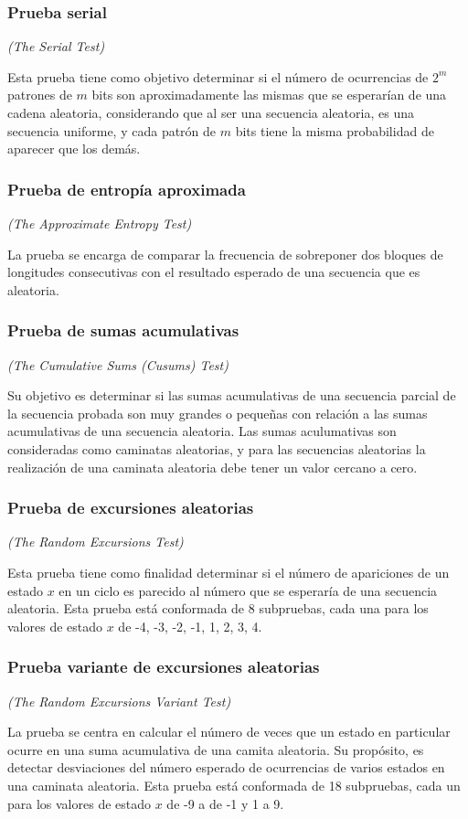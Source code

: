 \subsubsection{Prueba serial} %
\textit{(The Serial Test)}

Esta prueba tiene como objetivo determinar si el número de ocurrencias de
$2^m$ patrones de $m$ bits son aproximadamente las mismas que se esperarían
de una cadena aleatoria, considerando que al ser una secuencia aleatoria,
es una secuencia uniforme, y cada patrón de $m$ bits tiene la misma
probabilidad de aparecer que los demás.

\subsubsection{Prueba de entropía aproximada} %
\textit{(The Approximate Entropy Test)}

La prueba se encarga de comparar la frecuencia de sobreponer dos bloques de
longitudes consecutivas con el resultado esperado de una secuencia que es
aleatoria.

\subsubsection{Prueba de sumas acumulativas} %
\textit{(The Cumulative Sums (Cusums) Test)}

Su objetivo es determinar si las sumas acumulativas de una secuencia parcial
de la secuencia probada son muy grandes o pequeñas con relación a las sumas
acumulativas de una secuencia aleatoria. Las sumas aculumativas son
consideradas como caminatas aleatorias, y para las secuencias aleatorias
la realización de una caminata aleatoria debe tener un valor cercano a cero.

\subsubsection{Prueba de excursiones aleatorias} %
\textit{(The Random Excursions Test)}

Esta prueba tiene como finalidad determinar si el número de apariciones de un
estado $x$ en un ciclo es parecido al número que se esperaría de una secuencia
aleatoria. Esta prueba está conformada de 8 subpruebas, cada una para los
valores de estado $x$ de -4, -3, -2, -1, 1, 2, 3, 4.

\subsubsection{Prueba variante de excursiones aleatorias} %
\textit{(The Random Excursions Variant Test)}

La prueba se centra en calcular el número de veces que un estado en particular
ocurre en una suma acumulativa de una camita aleatoria. Su propósito, es
detectar desviaciones del número esperado de ocurrencias de varios estados
en una caminata aleatoria. Esta prueba está conformada de 18 subpruebas, cada
un para los valores de estado $x$ de -9 a de -1 y  1 a 9.
